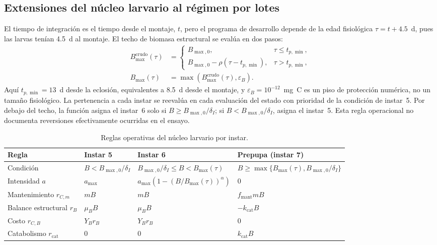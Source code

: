 \subsection{Extensiones del núcleo larvario al régimen por lotes}
\label{sup:extensiones}
El tiempo de integración es el tiempo desde el montaje, $t$, pero el
programa de desarrollo depende de la edad fisiológica
$\tau = t + 4.5$~d, pues las larvas tenían 4.5~d al montaje. El techo de
biomasa estructural se evalúa en dos pasos:
\begin{align*}
B_{\max}^{\mathrm{crudo}}(\tau) &=
\begin{cases}
B_{\max,0}, & \tau \leq t_{p,\min},\\
B_{\max,0} - \rho(\tau-t_{p,\min}), & \tau > t_{p,\min},
\end{cases}\\
B_{\max}(\tau) &= \max\!\left(B_{\max}^{\mathrm{crudo}}(\tau),\varepsilon_B\right).
\end{align*}
Aquí $t_{p,\min}=13$~d desde la eclosión, equivalentes a 8.5~d desde el
montaje, y $\varepsilon_B=10^{-12}$~mg~C es un piso de protección numérica,
no un tamaño fisiológico. La pertenencia a cada instar se reevalúa en cada
evaluación del estado con prioridad de la condición de instar~5. Por debajo
del techo, la función asigna el instar~6 solo si
$B\geq B_{\max,0}/\delta_I$; si $B<B_{\max,0}/\delta_I$, asigna el instar~5.
Esta regla operacional no documenta reversiones efectivamente ocurridas en el
ensayo.

\begin{table}[htbp]
  \centering
  \small
  \setlength{\tabcolsep}{3pt}
  \caption{Reglas operativas del núcleo larvario por instar.}
  \label{tab:instares}
  \begin{tabular}{p{2.1cm}p{3.5cm}p{4.5cm}p{3.1cm}}
    \toprule
    Regla & Instar 5 & Instar 6 & Prepupa (instar 7) \\
    \midrule
    Condición &
      $B<B_{\max,0}/\delta_I$ &
      $B_{\max,0}/\delta_I\leq B<B_{\max}(\tau)$ &
      $B\geq\max\{B_{\max}(\tau),B_{\max,0}/\delta_I\}$ \\
    Intensidad $a$ &
      $a_{\max}$ &
      $a_{\max}\left(1-(B/B_{\max}(\tau))^{\alpha}\right)$ &
      $0$ \\
    Mantenimiento $r_{C,m}$ &
      $mB$ & $mB$ & $f_{\mathrm{mant}}mB$ \\
    Balance estructural $r_B$ &
      $\mu_B B$ & $\mu_B B$ & $-k_{\mathrm{cat}}B$ \\
    Costo $r_{C,B}$ &
      $Y_B r_B$ & $Y_B r_B$ & $0$ \\
    Catabolismo $r_{\mathrm{cat}}$ &
      $0$ & $0$ & $k_{\mathrm{cat}}B$ \\
    \bottomrule
  \end{tabular}
\end{table}

